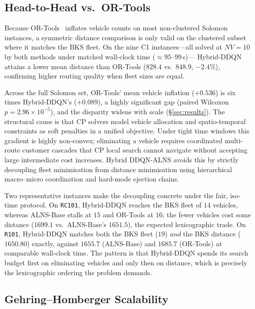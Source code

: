 \documentclass[conference]{IEEEtran}
\begin{document}
\subsection{Head-to-Head vs.\ OR-Tools}
\label{subsec:ortools_baseline}

Because OR-Tools~\cite{ortools} inflates vehicle counts on most non-clustered
Solomon instances, a symmetric distance comparison is only valid on the clustered
subset where it matches the BKS fleet. On the nine C1 instances---all solved at
$NV{=}10$ by both methods under matched wall-clock time ($\approx 95$--$99$\,s)---%
Hybrid-DDQN attains a lower mean distance than OR-Tools ($828.4$ vs.\ $848.9$,
$-2.4\%$), confirming higher routing quality when fleet sizes are equal.

Across the full Solomon set, OR-Tools' mean vehicle inflation ($+0.536$) is six
times Hybrid-DDQN's ($+0.089$), a highly significant gap (paired Wilcoxon
$p=2.96{\times}10^{-5}$), and the disparity widens with scale
(\S\ref{sec:results}). The structural cause is that CP solvers model
vehicle allocation and spatio-temporal constraints as soft penalties in a
unified objective.  Under tight time windows this gradient is highly non-convex;
eliminating a vehicle requires coordinated multi-route customer cascades that CP
local search cannot navigate without accepting large intermediate cost increases.
Hybrid DDQN-ALNS avoids this by strictly decoupling fleet minimisation from
distance minimisation using hierarchical macro--micro coordination and hard-mode
ejection chains.

Two representative instances make the decoupling concrete under the fair,
iso-time protocol. On \texttt{RC101}, Hybrid-DDQN reaches the BKS fleet of $14$
vehicles, whereas ALNS-Base stalls at $15$ and OR-Tools at $16$; the fewer
vehicles cost some distance ($1699.1$ vs.\ ALNS-Base's $1651.5$), the expected
lexicographic trade. On \texttt{R101}, Hybrid-DDQN matches both the BKS fleet
($19$) \emph{and} the BKS distance ($1650.80$) exactly, against $1655.7$
(ALNS-Base) and $1685.7$ (OR-Tools) at comparable wall-clock time. The pattern is
that Hybrid-DDQN spends its search budget first on eliminating vehicles and only
then on distance, which is precisely the lexicographic ordering the problem
demands.

\subsection{Gehring--Homberger Scalability}
\end{document}
